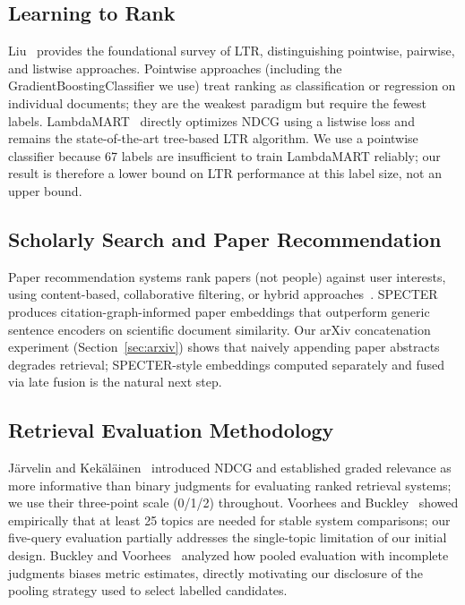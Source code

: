 \documentclass[11pt,a4paper]{article}
\begin{document}
\subsection{Learning to Rank}

Liu~\cite{liu2009learning} provides the foundational survey of LTR,
distinguishing pointwise, pairwise, and listwise approaches.
Pointwise approaches (including the GradientBoostingClassifier we use) treat
ranking as classification or regression on individual documents; they are the
weakest paradigm but require the fewest labels.
LambdaMART~\cite{burges2010ranknet} directly optimizes NDCG using a
listwise loss and remains the state-of-the-art tree-based LTR algorithm.
We use a pointwise classifier because 67 labels are insufficient to train
LambdaMART reliably; our result is therefore a lower bound on LTR performance
at this label size, not an upper bound.

\subsection{Scholarly Search and Paper Recommendation}

Paper recommendation systems rank papers (not people) against user interests,
using content-based, collaborative filtering, or hybrid
approaches~\cite{beel2016survey}.
SPECTER~\cite{cohan2020specter} produces citation-graph-informed paper
embeddings that outperform generic sentence encoders on scientific document
similarity.
Our arXiv concatenation experiment (Section~\ref{sec:arxiv}) shows that
naively appending paper abstracts degrades retrieval; SPECTER-style embeddings
computed separately and fused via late fusion is the natural next step.

\subsection{Retrieval Evaluation Methodology}

Järvelin and Kekäläinen~\cite{jarvelin2002} introduced NDCG and established
graded relevance as more informative than binary judgments for evaluating
ranked retrieval systems; we use their three-point scale (0/1/2) throughout.
Voorhees and Buckley~\cite{voorhees2002topic} showed empirically that at least
25 topics are needed for stable system comparisons; our five-query evaluation
partially addresses the single-topic limitation of our initial design.
Buckley and Voorhees~\cite{buckley2004incomplete} analyzed how pooled
evaluation with incomplete judgments biases metric estimates, directly
motivating our disclosure of the pooling strategy used to select labelled
candidates.
\end{document}
